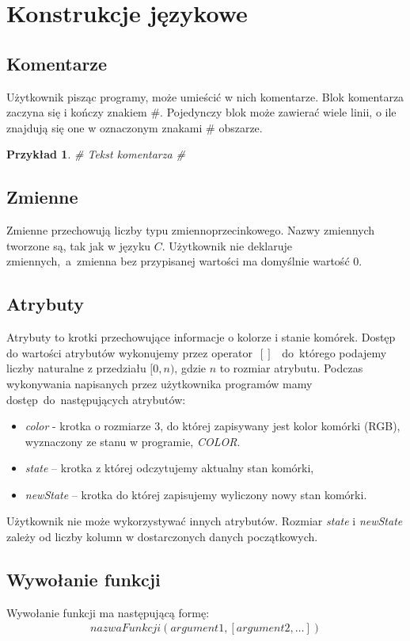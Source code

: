 \documentclass[declaration,shortabstract, inz]{iithesis}
\theoremstyle{definition} \newtheorem{definition}{Definicja}[]
\theoremstyle{plain} \newtheorem{remark}[definition]{Obserwacja}
\theoremstyle{plain} \newtheorem{theorem}[definition]{Twierdzenie}
\theoremstyle{plain} \newtheorem{example}{Przykład}[definition]
\theoremstyle{plain} \newtheorem{lemma}[definition]{Lemat}
\begin{document}
\section{Konstrukcje językowe}

\subsection{Komentarze}

Użytkownik pisząc programy, może umieścić w nich komentarze. Blok komentarza zaczyna się i kończy znakiem \#. 
Pojedynczy blok może zawierać wiele linii, o ile znajdują się one w oznaczonym znakami \# obszarze.

\begin{example}
\# Tekst komentarza \#
\end{example}

\subsection{Zmienne}
Zmienne przechowują liczby typu zmiennoprzecinkowego. Nazwy zmiennych tworzone są, tak jak w języku $C$. Użytkownik nie deklaruje zmiennych,~a~zmienna bez przypisanej wartości ma domyślnie wartość $0$.

\subsection{Atrybuty}
Atrybuty to krotki przechowujące informacje o kolorze i stanie komórek. Dostęp do wartości atrybutów wykonujemy przez operator~$[]$~ do~którego podajemy liczby naturalne z przedziału $[0, n)$, gdzie $n$ to rozmiar atrybutu. Podczas wykonywania napisanych przez użytkownika programów mamy dostęp~do~następujących atrybutów: 
	\begin{itemize}
	\item \textit{color} - krotka o rozmiarze $3$, do której zapisywany jest kolor komórki (RGB), wyznaczony ze stanu w programie, \textit{COLOR}. 
	\item \textit{state} -- krotka z której odczytujemy aktualny stan komórki,
	\item \textit{newState} -- krotka do której zapisujemy wyliczony nowy stan komórki.
	\end{itemize}
Użytkownik nie może wykorzystywać innych atrybutów. Rozmiar \textit{state} i \textit{newState} zależy od liczby kolumn w dostarczonych danych początkowych.

\subsection{Wywołanie funkcji}
Wywołanie funkcji ma następującą formę:
\begin{align}
nazwaFunkcji(argument1,[argument2, \dots])
\end{align}
\end{document}
